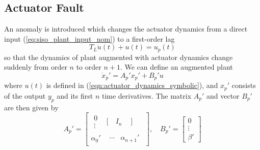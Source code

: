 \subsection{Actuator Fault} \label{subsec:siso_act_fault}
An anomaly is introduced which changes the actuator dynamics from a direct input (\ref{eq:siso_plant_input_nom}) to a first-order lag
\begin{equation}
	T_L\dot{u}(t) + u(t) = u_p(t) \label{eqn:actuator_dynamics_symbolic}
\end{equation} 
\noindent so that the dynamics of plant augmented with actuator dynamics change suddenly from order $n$ to order $n+1$. We can define an augmented plant 
\begin{equation}
	\dot{x}_p' = A_p' x_p' + B_p' u	\label{eqn:plant_3_compact}
\end{equation}
where $u(t)$ is defined in (\ref{eqn:actuator_dynamics_symbolic}), and $x_p'$ consists of the output $y_p$ and its first $n$ time derivatives. The matrix $A_p'$ and vector $B_p'$ are then given by
\begin{equation}
	A_p' = \begin{bmatrix}
		\begin{matrix}0 \\ \vdots \end{matrix} & \Bigg[ \quad I_n \quad ~ \Bigg] \\ \alpha_0' & \begin{matrix}\cdots & \alpha_{n+1}' \end{matrix}
	\end{bmatrix}, \quad B_p' = \begin{bmatrix}
		0 \\ \vdots \\ \beta'
	\end{bmatrix}
	\label{eqn:plant_3_symbolic}
\end{equation}
